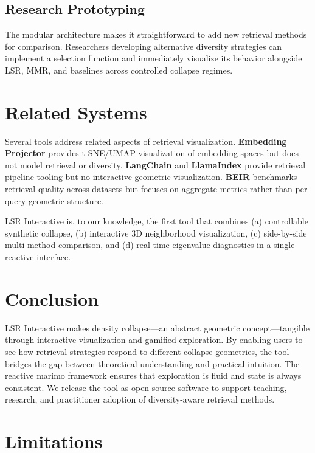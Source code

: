 \documentclass[11pt]{article}
\begin{document}
\subsection{Research Prototyping}
The modular architecture makes it straightforward to add new retrieval methods for comparison. Researchers developing alternative diversity strategies can implement a selection function and immediately visualize its behavior alongside LSR, MMR, and baselines across controlled collapse regimes.

\section{Related Systems}

Several tools address related aspects of retrieval visualization. \textbf{Embedding Projector} \citep{smilkov2016embedding} provides t-SNE/UMAP visualization of embedding spaces but does not model retrieval or diversity. \textbf{LangChain} and \textbf{LlamaIndex} provide retrieval pipeline tooling but no interactive geometric visualization. \textbf{BEIR} benchmarks retrieval quality across datasets but focuses on aggregate metrics rather than per-query geometric structure.

LSR Interactive is, to our knowledge, the first tool that combines (a) controllable synthetic collapse, (b) interactive 3D neighborhood visualization, (c) side-by-side multi-method comparison, and (d) real-time eigenvalue diagnostics in a single reactive interface.

\section{Conclusion}

LSR Interactive makes density collapse---an abstract geometric concept---tangible through interactive visualization and gamified exploration. By enabling users to see how retrieval strategies respond to different collapse geometries, the tool bridges the gap between theoretical understanding and practical intuition. The reactive marimo framework ensures that exploration is fluid and state is always consistent. We release the tool as open-source software to support teaching, research, and practitioner adoption of diversity-aware retrieval methods.

\section*{Limitations}
\end{document}
